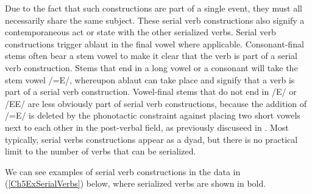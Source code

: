 Due to the fact that such constructions are part of a single event, they must all necessarily share the same subject. These serial verb constructions also signify a contemporaneous act or state with the other serialized verbs. Serial verb constructions trigger ablaut in the final vowel where applicable. Consonant-final stems often bear a stem vowel to make it clear that the verb is part of a serial verb construction. Stems that end in a long vowel or a consonant will take the stem vowel /=E/, whereupon ablaut can take place and signify that a verb is part of a serial verb construction. Vowel-final stems that do not end in /E/ or /EE/ are less obviously part of serial verb constructions, because the addition of /=E/ is deleted by the phonotactic constraint against placing two short vowels next to each other in the post-verbal field, as previously discuseed in . Most typically, serial verbs constructions appear as a dyad, but there is no practical limit to the number of verbs that can be serialized.

We can see examples of serial verb constructions in the data in (\ref{Ch5ExSerialVerbs}) below, where serialized verbs are shown in bold.

\newpage

